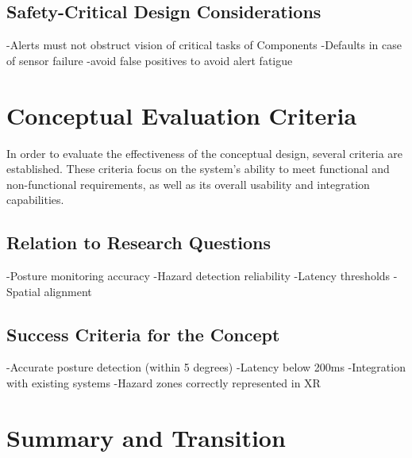 \subsection{Safety-Critical Design Considerations}
-Alerts must not obstruct vision of critical tasks of Components
-Defaults in case of sensor failure
-avoid false positives to avoid alert fatigue


\section{Conceptual Evaluation Criteria}
In order to evaluate the effectiveness of the conceptual design, several criteria are established. These criteria focus on the system's ability to meet functional and non-functional requirements, as well as its overall usability and integration capabilities.
\subsection{Relation to Research Questions}

-Posture monitoring accuracy
-Hazard detection reliability
-Latency thresholds
-Spatial alignment 

\subsection{Success Criteria for the Concept}
-Accurate posture detection (within 5 degrees)
-Latency below 200ms
-Integration with existing systems
-Hazard zones correctly represented in XR

\section{Summary and Transition}
